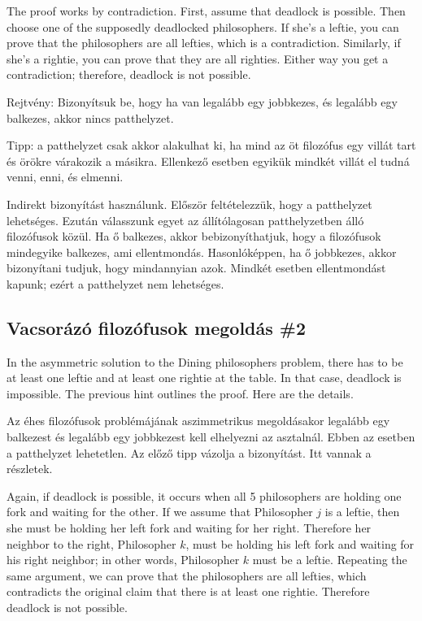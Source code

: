 \documentclass{book}
\newcommand{\clearemptydoublepage}{\newpage\cleardoublepage}
\begin{document}
The proof works by contradiction.  First, assume that deadlock is
possible.  Then choose one of the supposedly deadlocked philosophers.
If she's a leftie, you can prove that the philosophers are all
lefties, which is a contradiction.  Similarly, if she's a rightie, you
can prove that they are all righties.  Either way you get a
contradiction; therefore, deadlock is not possible.

Rejtvény: Bizonyítsuk be, hogy ha van legalább egy jobbkezes, és
legalább egy balkezes, akkor nincs patthelyzet.

Tipp: a patthelyzet csak akkor alakulhat ki, ha mind az öt filozófus egy
villát tart és örökre várakozik a másikra. Ellenkező esetben egyikük
mindkét villát el tudná venni, enni, és elmenni.

Indirekt bizonyítást használunk. Először feltételezzük, hogy a patthelyzet
lehetséges. Ezután válasszunk egyet az állítólagosan patthelyzetben álló
filozófusok közül. Ha ő balkezes, akkor bebizonyíthatjuk, hogy a
filozófusok mindegyike balkezes, ami ellentmondás. Hasonlóképpen,
ha ő jobbkezes, akkor bizonyítani tudjuk, hogy mindannyian azok.
Mindkét esetben ellentmondást kapunk; ezért a patthelyzet nem lehetséges.

\clearemptydoublepage
\subsection{Vacsorázó filozófusok megoldás \#2}

In the asymmetric solution to the Dining philosophers problem,
there has to be at least one leftie and at least one rightie at
the table.  In that case, deadlock is impossible.  The previous
hint outlines the proof.  Here are the details.

Az éhes filozófusok problémájának aszimmetrikus megoldásakor
legalább egy balkezest és legalább egy jobbkezest kell elhelyezni
az asztalnál. Ebben az esetben a patthelyzet lehetetlen. Az előző tipp
vázolja a bizonyítást. Itt vannak a részletek.

Again, if deadlock is possible, it occurs when all 5 philosophers
are holding one fork and waiting for the other.  If we assume that
Philosopher $j$ is a leftie, then she must be holding her left
fork and waiting for her right.  Therefore her neighbor to the right,
Philosopher $k$, must be holding his left fork and waiting for
his right neighbor; in other words, Philosopher $k$ must be a leftie.
Repeating the same argument, we can prove that the philosophers
are all lefties, which contradicts the original claim that there
is at least one rightie.  Therefore deadlock is not possible.
\end{document}
